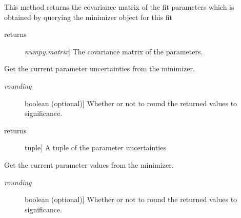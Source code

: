 \documentclass[a4paper,10pt,english]{sphinxmanual}
\begin{document}
\begin{fulllineitems}
\begin{fulllineitems}
\begin{description}
\end{description}

\end{fulllineitems}


\begin{fulllineitems}
\label{index:kafe.fit.Fit.get_error_matrix}
This method returns the covariance matrix of the fit parameters which is obtained
by querying the minimizer object for this fit
\begin{description}
\item[{returns}] \leavevmode{[}\emph{numpy.matrix}{]}
The covariance matrix of the parameters.

\end{description}

\end{fulllineitems}


\begin{fulllineitems}
\label{index:kafe.fit.Fit.get_parameter_errors}
Get the current parameter uncertainties from the minimizer.
\begin{description}
\item[{\emph{rounding}}] \leavevmode{[}boolean (optional){]}
Whether or not to round the returned values to significance.

\item[{returns}] \leavevmode{[}tuple{]}
A tuple of the parameter uncertainties

\end{description}

\end{fulllineitems}


\begin{fulllineitems}
\label{index:kafe.fit.Fit.get_parameter_values}
Get the current parameter values from the minimizer.
\begin{description}
\item[{\emph{rounding}}] \leavevmode{[}boolean (optional){]}
Whether or not to round the returned values to significance.


\end{description}
\end{fulllineitems}
\end{fulllineitems}
\end{document}
